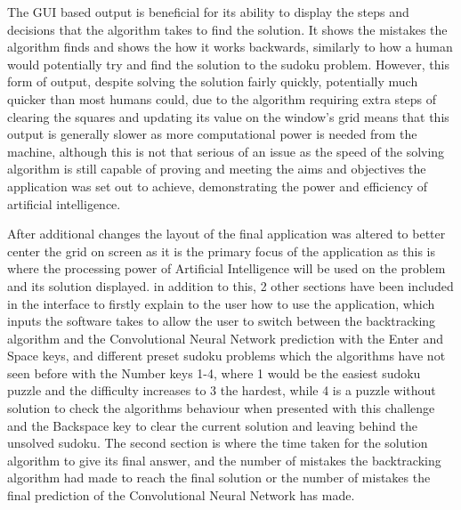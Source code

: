 \documentclass[]{final_report}
\begin{document}
\clearpage
The GUI based output is beneficial for its ability to display the steps and decisions that the algorithm takes to find the solution. It shows the mistakes the algorithm finds and shows the how it works backwards, similarly to how a human would potentially try and find the solution to the sudoku problem. However, this form of output, despite solving the solution fairly quickly, potentially much quicker than most humans could, due to the algorithm requiring extra steps of clearing the squares and updating its value on the window’s grid means that this output is generally slower as more computational power is needed from the machine, although this is not that serious of an issue as the speed of the solving algorithm is still capable of proving and meeting the aims and objectives the application was set out to achieve, demonstrating the power and efficiency of artificial intelligence. 

After additional changes the layout of the final application was altered to better center the grid on screen as it is the primary focus of the application as this is where the processing power of Artificial Intelligence will be used on the problem and its solution displayed. in addition to this, 2 other sections have been included in the interface to firstly explain to the user how to use the application, which inputs the software takes to allow the user to switch between the backtracking algorithm and the Convolutional Neural Network prediction with the Enter and Space keys, and different preset sudoku problems which the algorithms have not seen before with the Number keys 1-4, where 1 would be the easiest sudoku puzzle and the difficulty increases to 3 the hardest, while 4 is a puzzle without solution to check the algorithms behaviour when presented with this challenge and the Backspace key to clear the current solution and leaving behind the unsolved sudoku. The second section is where the time taken for the solution algorithm to give its final answer, and the number of mistakes the backtracking algorithm had made to reach the final solution or the number of mistakes the final prediction of the Convolutional Neural Network has made. 
\end{document}
